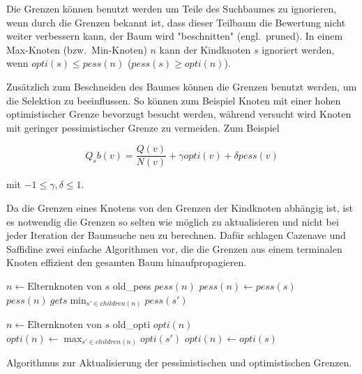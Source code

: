 Die Grenzen können benutzt werden um Teile des Suchbaumes zu ignorieren, wenn durch die Grenzen bekannt ist, dass dieser Teilbaum die Bewertung nicht weiter verbessern kann, der Baum wird "beschnitten" (engl.\ pruned).
In einem Max-Knoten (bzw.\ Min-Knoten) $n$ kann der Kindknoten $s$ ignoriert werden, wenn $opti(s) \le pess(n)$ ($pess(s) \ge opti(n)$).\cite[\ppno~5]{cazenaveScoreBoundedMonteCarlo2011}

Zusätzlich zum Beschneiden des Baumes können die Grenzen benutzt werden, um die Selektion zu beeinflussen.
So können zum Beispiel Knoten mit einer hohen optimistischer Grenze bevorzugt besucht werden, während versucht wird Knoten mit geringer pessimistischer Grenze zu vermeiden.
Zum Beispiel

\begin{equation}
Q_sb(v) = \frac{Q(v)}{N(v)} + \gamma opti(v) + \delta pess(v)
\label{eqn:scorebound}
\end{equation}

mit $-1 \le \gamma, \delta \le 1$.

Da die Grenzen eines Knotens von den Grenzen der Kindknoten abhängig ist, ist es notwendig die Grenzen so selten wie möglich zu aktualisieren und nicht bei jeder Iteration der Baumsuche neu zu berechnen.
Dafür schlagen Cazenave und Saffidine zwei einfache Algorithmen vor, die die Grenzen aus einem terminalen Knoten effizient den gesamten Baum hinaufpropagieren.


\begin{algorithm}[H]
\begin{algorithmic}
		\State $n \gets \text{Elternknoten von }s$
		\State old\_pess \gets $pess(n)$
				\State $pess(n) \gets pess(s)$
			\Else
				\State $pess(n) \ gets \min_{s' \in children(n)}pess(s')$
				\EndIf
			\EndIf
		\EndIf
	\EndIf
\EndFunction


		\State $n \gets \text{Elternknoten von }s$
		\State old\_opti \gets $opti(n)$
				\State $opti(n) \gets \max_{s' \in children(n)}opti(s')$
				\EndIf
			\Else
				\State $opti(n) \gets opti(s)$
			\EndIf
		\EndIf
	\EndIf
\EndFunction
\end{algorithmic}
\caption{Algorithmus zur Aktualisierung der pessimistischen und optimistischen Grenzen.\footnotemark}
\label{algo:prop-scorebound}
\end{algorithm}

